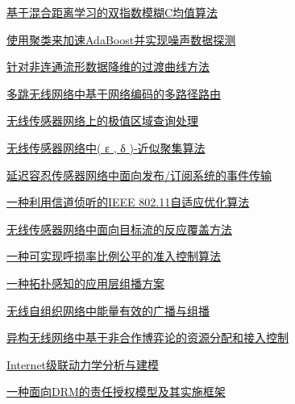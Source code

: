 \documentclass[a4paper]{article}
\begin{document}
\href{http://www.jos.org.cn/ch/reader/download_pdf.aspx?file_no=3607&year_id=2010&quarter_id=8&falg=1}{基于混合距离学习的双指数模糊C均值算法}

\href{http://www.jos.org.cn/ch/reader/download_pdf.aspx?file_no=3611&year_id=2010&quarter_id=8&falg=1}{使用聚类来加速AdaBoost并实现噪声数据探测}

\href{http://www.jos.org.cn/ch/reader/download_pdf.aspx?file_no=3648&year_id=2010&quarter_id=8&falg=1}{针对非连通流形数据降维的过渡曲线方法}

\href{http://www.jos.org.cn/ch/reader/download_pdf.aspx?file_no=3810&year_id=2010&quarter_id=8&falg=1}{多跳无线网络中基于网络编码的多路径路由}

\href{http://www.jos.org.cn/ch/reader/download_pdf.aspx?file_no=3710&year_id=2010&quarter_id=8&falg=1}{无线传感器网络上的极值区域查询处理}

\href{http://www.jos.org.cn/ch/reader/download_pdf.aspx?file_no=3641&year_id=2010&quarter_id=8&falg=1}{无线传感器网络中( ε , δ )-近似聚集算法}

\href{http://www.jos.org.cn/ch/reader/download_pdf.aspx?file_no=3583&year_id=2010&quarter_id=8&falg=1}{延迟容忍传感器网络中面向发布/订阅系统的事件传输}

\href{http://www.jos.org.cn/ch/reader/download_pdf.aspx?file_no=3637&year_id=2010&quarter_id=8&falg=1}{一种利用信道侦听的IEEE 802.11自适应优化算法}

\href{http://www.jos.org.cn/ch/reader/download_pdf.aspx?file_no=3590&year_id=2010&quarter_id=8&falg=1}{无线传感器网络中面向目标流的反应覆盖方法}

\href{http://www.jos.org.cn/ch/reader/download_pdf.aspx?file_no=3598&year_id=2010&quarter_id=8&falg=1}{一种可实现呼损率比例公平的准入控制算法}

\href{http://www.jos.org.cn/ch/reader/download_pdf.aspx?file_no=3594&year_id=2010&quarter_id=8&falg=1}{一种拓扑感知的应用层组播方案}

\href{http://www.jos.org.cn/ch/reader/download_pdf.aspx?file_no=3619&year_id=2010&quarter_id=8&falg=1}{无线自组织网络中能量有效的广播与组播}

\href{http://www.jos.org.cn/ch/reader/download_pdf.aspx?file_no=3638&year_id=2010&quarter_id=8&falg=1}{异构无线网络中基于非合作博弈论的资源分配和接入控制}

\href{http://www.jos.org.cn/ch/reader/download_pdf.aspx?file_no=3652&year_id=2010&quarter_id=8&falg=1}{Internet级联动力学分析与建模}

\href{http://www.jos.org.cn/ch/reader/download_pdf.aspx?file_no=3646&year_id=2010&quarter_id=8&falg=1}{一种面向DRM的责任授权模型及其实施框架}
\end{document}
